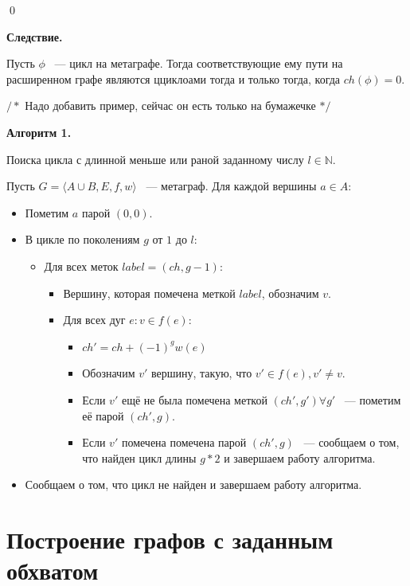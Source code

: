\documentclass[14pt]{mmcs-article}
\begin{document}
\qed

\textbf{Следствие.}

Пусть $\phi$ ~--- цикл на метаграфе. Тогда соответствующие ему пути на расширенном графе являются цциклоами тогда и только тогда, когда $ch(\phi) = 0$.

$/*$ Надо добавить пример, сейчас он есть только на бумажечке $*/$

\textbf{Алгоритм 1.}

Поиска цикла с длинной меньше или раной заданному числу $l \in \mathbb{N}$.

Пусть $G = \langle A \cup B, E,f,w\rangle$ ~--- метаграф. Для каждой вершины $a \in A:$

\begin{itemize}
    \item Пометим $a$ парой $(0, 0)$.
    \item В цикле по поколениям $g$ от $1$ до $l$:
      \begin{itemize}
      \item Для всех меток $label = (ch, g - 1)$:
        \begin{itemize}
        \item Вершину, которая помечена меткой $label$, обозначим $v$.
        \item Для всех дуг $e: v \in f(e)$:
          \begin{itemize}
          \item $ch' = ch + (-1)^{g} w(e)$
          \item Обозначим $v'$ вершину, такую, что $v' \in f(e), v' \neq v$.
          \item Если $v'$ ещё не была помечена меткой $(ch', g') \forall g'$ ~--- пометим её парой $(ch', g)$.
          \item Если $v'$ помечена помечена парой $(ch', g)$ ~--- сообщаем о том, что найден цикл длины $g * 2$ и завершаем работу алгоритма.
          \end{itemize}
        \end{itemize}
      \end{itemize}
    \item Сообщаем о том, что цикл не найден и завершаем работу алгоритма.
\end{itemize}

\pagebreak
\section*{Построение графов с заданным обхватом}
\end{document}
